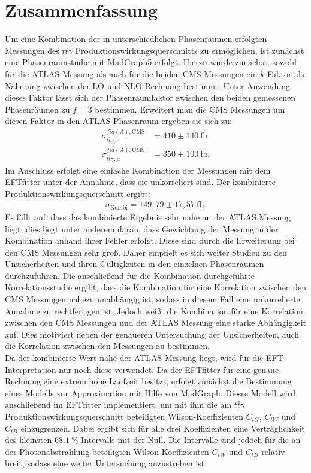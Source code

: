 \chapter{Zusammenfassung}
Um eine Kombination der in unterschiedlichen Phasenräumen erfolgten Messungen des $t\bar{t}\gamma$ Produktionswirkungsquerschnitts zu ermöglichen, ist zunächst eine Phasenraumstudie mit MadGraph5 erfolgt. Hierzu wurde zunächst, sowohl für die ATLAS Messung als auch für die beiden CMS-Messungen ein $k$-Faktor als Näherung zwischen der LO und NLO Rechnung bestimmt. Unter Anwendung dieses Faktor lässt sich der Phasenraumfaktor zwischen den beiden gemessenen Phasenräumen zu $f=3$ bestimmen. Erweitert man die CMS Messungen um diesen Faktor in den ATLAS Phasenraum ergeben sie sich zu:
\begin{align*}
  \sigma^{fid(A), \text{CMS}}_{t\bar{t}\gamma, e} &= 410 \pm 140~ \si{\femto\barn}\\
  \sigma^{fid(A), \text{CMS}}_{t\bar{t}\gamma, \mu} &= 350 \pm 100~ \si{\femto\barn}.
\end{align*}
Im Anschluss erfolgt eine einfache Kombination der Messungen mit dem EFTfitter unter der Annahme, dass sie unkorreliert sind. Der kombinierte Produktionswirkungsquerschnitt ergibt:
\begin{align*}
  \sigma_{\text{Kombi}} = 149,79 \pm 17,57~ \si{\femto\barn}.
\end{align*}
Es fällt auf, dass das kombinierte Ergebnis sehr nahe an der ATLAS Messung liegt, dies liegt unter anderem daran, dass Gewichtung der Messung in der Kombination anhand ihrer Fehler erfolgt. Diese sind durch die Erweiterung bei den CMS Messungen sehr groß. Daher empfielt es sich weiter Studien zu den Unsicherheiten und ihren Gültigkeiten in den einzelnen Phasenräumen durchzuführen. Die anschließend für die Kombination durchgeführte Korrelationsstudie ergibt, dass die Kombination für eine Korrelation zwischen den CMS Messungen nahezu unabhängig ist, sodass in diesem Fall eine unkorrelierte Annahme zu rechtfertigen ist. Jedoch weißt die Kombination für eine Korrelation zwischen den CMS Messungen und der ATLAS Messung eine starke Abhängigkeit auf. Dies motiviert neben der genaueren Untersuchung der Unsicherheiten, auch die Korrelation zwischen den Messungen zu bestimmen.\\
Da der kombinierte Wert nahe der ATLAS Messung liegt, wird für die EFT-Interpretation nur noch diese verwendet. Da der EFTfitter für eine genaue Rechnung eine extrem hohe Laufzeit besitzt, erfolgt zunächst die Bestimmung eines Modells zur Approximation mit Hilfe von MadGraph. Dieses Modell wird anschließend im EFTfitter implementiert, um mit ihm die am $t\bar{t}\gamma$ Produktionswirkungsquerschnitt beteiligten Wilson-Koeffizienten $C_{tG}$, $C_{tW}$ und $C_{tB}$ einzugrenzen. Dabei ergibt sich für alle drei Koeffizienten eine Verträglichkeit des kleinsten $\SI{68.1}{\percent}$ Intervalls mit der Null. Die Intervalle sind jedoch für die an der Photonabstrahlung beteiligten Wilson-Koeffizienten $C_{tW}$ und $C_{tB}$ relativ breit, sodass eine weiter Untersuchung anzustreben ist.

